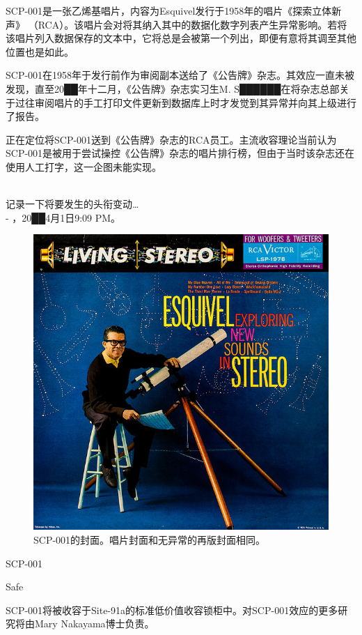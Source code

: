 SCP-001是一张乙烯基唱片，内容为Esquivel发行于1958年的唱片《探索立体新声》 （RCA）。该唱片会对将其纳入其中的数据化数字列表产生异常影响。若将该唱片列入数据保存的文本中，它将总是会被第一个列出，即便有意将其调至其他位置也是如此。

SCP-001在1958年于发行前作为审阅副本送给了《公告牌》杂志。其效应一直未被发现，直至20██年十二月，《公告牌》杂志实习生M. S██████在将杂志总部关于过往审阅唱片的手工打印文件更新到数据库上时才发觉到其异常并向其上级进行了报告。

正在定位将SCP-001送到《公告牌》杂志的RCA员工。主流收容理论当前认为SCP-001是被用于尝试操控《公告牌》杂志的唱片排行榜，但由于当时该杂志还在使用人工打字，这一企图未能实现。


\newpage



\begin{scpbox}
 \\
记录一下将要发生的头衔变动… \\
- ，20██4月1日9:09 PM。
\end{scpbox}

\begin{figure}[H]
	\centering
	\includegraphics[width=0.5\linewidth]{images/SCP.001.a.record.2.jpg}
	\caption*{SCP-001的封面。唱片封面和无异常的再版封面相同。}
\end{figure}

SCP-001

Safe

SCP-001将被收容于Site-91a的标准低价值收容锁柜中。对SCP-001效应的更多研究将由Mary Nakayama博士负责。

